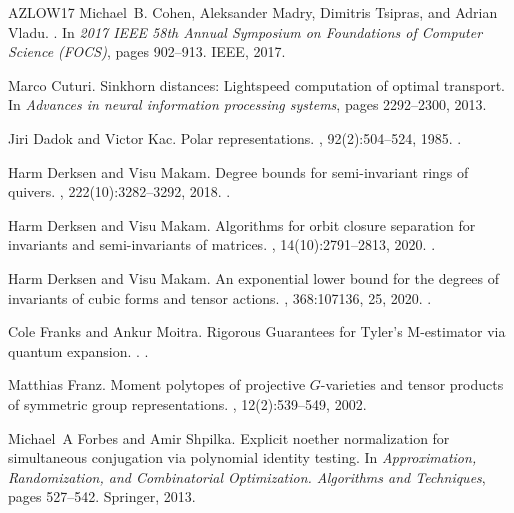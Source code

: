 \documentclass[10pt,a4paper]{article}
\numberwithin{equation}{section}
\begin{document}
\begin{thebibliography}{AZLOW17}
Michael~B. Cohen, Aleksander Madry, Dimitris Tsipras, and Adrian Vladu.
.
\newblock In {\em 2017 IEEE 58th Annual Symposium on Foundations of Computer
  Science (FOCS)}, pages 902--913. IEEE, 2017.

Marco Cuturi.
\newblock Sinkhorn distances: Lightspeed computation of optimal transport.
\newblock In {\em Advances in neural information processing systems}, pages
  2292--2300, 2013.

Jiri Dadok and Victor Kac.
\newblock Polar representations.
, 92(2):504--524, 1985.
\newblock \href {https://doi.org/10.1016/0021-8693(85)90136-X}
  {}.

Harm Derksen and Visu Makam.
\newblock Degree bounds for semi-invariant rings of quivers.
, 222(10):3282--3292, 2018.
\newblock \href {https://doi.org/10.1016/j.jpaa.2017.12.007}
  {}.

Harm Derksen and Visu Makam.
\newblock Algorithms for orbit closure separation for invariants and
  semi-invariants of matrices.
, 14(10):2791--2813, 2020.
\newblock \href {https://doi.org/10.2140/ant.2020.14.2791}
  {}.

Harm Derksen and Visu Makam.
\newblock An exponential lower bound for the degrees of invariants of cubic
  forms and tensor actions.
, 368:107136, 25, 2020.
\newblock \href {https://doi.org/10.1016/j.aim.2020.107136}
  {}.

Cole Franks and Ankur Moitra.
\newblock Rigorous {G}uarantees for {T}yler's {M}-estimator via quantum
  expansion.
.
\newblock \href {http://arxiv.org/abs/2002.00071} {}.

Matthias Franz.
\newblock Moment polytopes of projective {$G$}-varieties and tensor products of
  symmetric group representations.
, 12(2):539--549, 2002.

Michael~A Forbes and Amir Shpilka.
\newblock Explicit noether normalization for simultaneous conjugation via
  polynomial identity testing.
\newblock In {\em Approximation, Randomization, and Combinatorial Optimization.
  Algorithms and Techniques}, pages 527--542. Springer, 2013.


\end{thebibliography}
\end{document}
